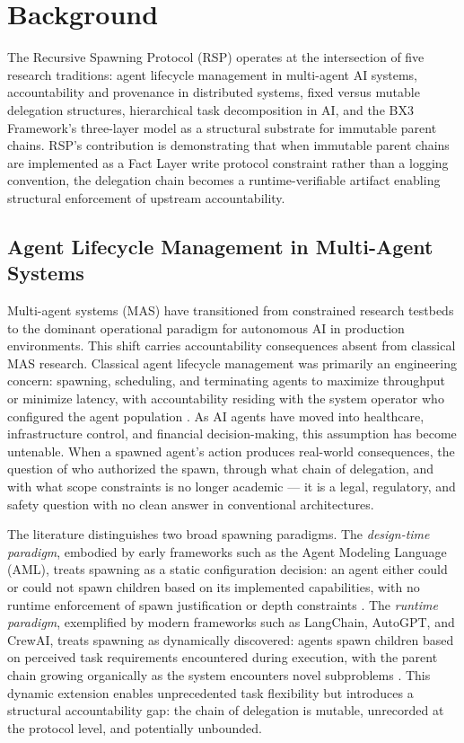 \section{Background}
\label{sec:background}

The Recursive Spawning Protocol (RSP) operates at the intersection of five research traditions: agent lifecycle management in multi-agent AI systems, accountability and provenance in distributed systems, fixed versus mutable delegation structures, hierarchical task decomposition in AI, and the BX3 Framework's three-layer model as a structural substrate for immutable parent chains. RSP's contribution is demonstrating that when immutable parent chains are implemented as a Fact Layer write protocol constraint rather than a logging convention, the delegation chain becomes a runtime-verifiable artifact enabling structural enforcement of upstream accountability.

\subsection{Agent Lifecycle Management in Multi-Agent Systems}

Multi-agent systems (MAS) have transitioned from constrained research testbeds to the dominant operational paradigm for autonomous AI in production environments. This shift carries accountability consequences absent from classical MAS research. Classical agent lifecycle management was primarily an engineering concern: spawning, scheduling, and terminating agents to maximize throughput or minimize latency, with accountability residing with the system operator who configured the agent population \cite{bansal2019}. As AI agents have moved into healthcare, infrastructure control, and financial decision-making, this assumption has become untenable. When a spawned agent's action produces real-world consequences, the question of who authorized the spawn, through what chain of delegation, and with what scope constraints is no longer academic --- it is a legal, regulatory, and safety question with no clean answer in conventional architectures.

The literature distinguishes two broad spawning paradigms. The \emph{design-time paradigm}, embodied by early frameworks such as the Agent Modeling Language (AML), treats spawning as a static configuration decision: an agent either could or could not spawn children based on its implemented capabilities, with no runtime enforcement of spawn justification or depth constraints \cite{bansal2019}. The \emph{runtime paradigm}, exemplified by modern frameworks such as LangChain, AutoGPT, and CrewAI, treats spawning as dynamically discovered: agents spawn children based on perceived task requirements encountered during execution, with the parent chain growing organically as the system encounters novel subproblems \cite{autoGPT2023,langchain2023}. This dynamic extension enables unprecedented task flexibility but introduces a structural accountability gap: the chain of delegation is mutable, unrecorded at the protocol level, and potentially unbounded.

